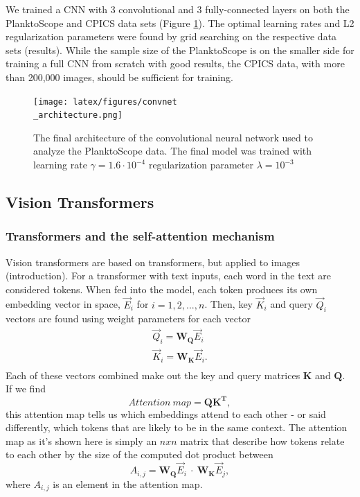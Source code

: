 We trained a CNN with 3 convolutional and 3 fully-connected layers on both the PlanktoScope and CPICS data sets (Figure \ref{fig:conv-arch}). The optimal learning rates and L2 regularization parameters were found by grid searching on the respective data sets (results). While the sample size of the PlanktoScope is on the smaller side for training a full CNN from scratch with good results, the CPICS data, with more than 200,000 images, should be sufficient for training.

\begin{figure}
    \centering
    \texttt{[image: latex/figures/convnet\\\_architecture.png]}
    \caption{The final architecture of the convolutional neural network used to analyze the PlanktoScope data. The final model was trained with learning rate $\gamma=1.6 \cdot 10^{-4}$ regularization parameter $\lambda = 10^{-3}$}
    \label{fig:conv-arch}
\end{figure}



\subsection{Vision Transformers} \label{ssec:vit}

\subsubsection{Transformers and the self-attention mechanism}
Vision transformers are based on transformers, but applied to images (introduction). For a transformer with text inputs, each word in the text are considered tokens. When fed into the model, each token produces its own embedding vector in space, $\vec{E}_i$ for $i = {1, 2, ..., n}$. Then, key $\vec{K}_i$ and query $\vec{Q}_i$ vectors are found using weight parameters for each vector
\begin{equation}
    \begin{split}
    \vec{Q}_i = \boldsymbol{W_Q} \vec{E}_i  \\
    \vec{K}_i = \boldsymbol{W_K} \vec{E}_i . \\
    \end{split}
\end{equation}
Each of these vectors combined make out the key and query matrices $\boldsymbol{K}$ and $\boldsymbol{Q}$. If we find
\begin{equation}
    Attention\ map = \boldsymbol{QK^T},
\end{equation}
this attention map tells us which embeddings attend to each other - or said differently, which tokens that are likely to be in the same context. The attention map as it's shown here is simply an $n x n$ matrix that describe how tokens relate to each other by the size of the computed dot product between 
\begin{equation}
   A_{i, j} =  \boldsymbol{W_Q} \vec{E}_i \ \cdot \ \boldsymbol{W_K} \vec{E}_j, 
\end{equation}
where $A_{i, j}$ is an element in the attention map. 

